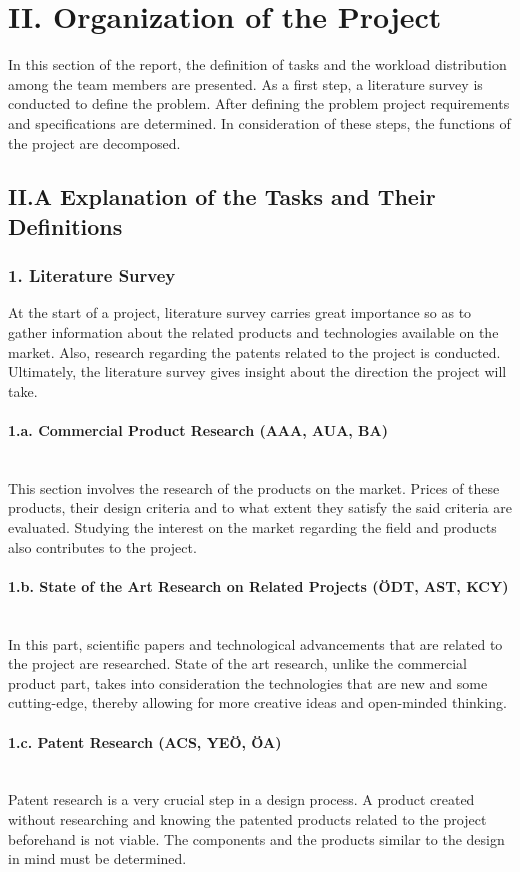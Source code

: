 \documentclass[12pt]{article}
\newcommand{\paragraphs}[1]{\paragraph*{#1}\mbox{}\\}
\begin{document}
    
\section*{II. Organization of the Project}

In this section of the report, the definition of tasks and the workload distribution among the team members are presented. As a first step, a literature survey is conducted to define the problem. After defining the problem project requirements and specifications are determined. In consideration of these steps, the functions of the project are decomposed. \\

\subsection*{II.A Explanation of the Tasks and Their Definitions}

\subsubsection*{1. Literature Survey}
At the start of a project, literature survey carries great importance so as to gather information about the related products and technologies available on the market. Also, research regarding the patents related to the project is conducted. Ultimately, the literature survey gives insight about the direction the project will take. 

\paragraphs{1.a. Commercial Product Research (AAA, AUA, BA)}
This section involves the research of the products on the market. Prices of these products, their design criteria and to what extent they satisfy the said criteria are evaluated. Studying the interest on the market regarding the field and products also contributes to the project. 

\paragraphs{1.b. State of the Art Research on Related Projects (ÖDT, AST, KCY)}
In this part, scientific papers and technological advancements that are related to the project are researched. State of the art research, unlike the commercial product part, takes into consideration the technologies that are new and some cutting-edge, thereby allowing for more creative ideas and open-minded thinking. 

\paragraphs{1.c. Patent Research (ACS, YEÖ, ÖA)}
Patent research is a very crucial step in a design process. A product created without researching and knowing the patented products related to the project beforehand is not viable. The components and the products similar to the design in mind must be determined.  
\end{document}
